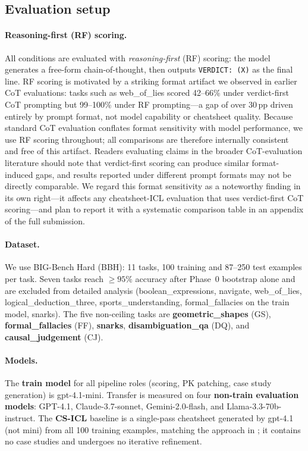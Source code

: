 \documentclass{article}
\begin{document}
\subsection{Evaluation setup}
\label{sec:eval}

\paragraph{Reasoning-first (RF) scoring.}
All conditions are evaluated with \emph{reasoning-first} (RF) scoring: the model generates a
free-form chain-of-thought, then outputs \texttt{VERDICT:~(X)} as the final line.
RF scoring is motivated by a striking format artifact we observed in earlier CoT evaluations:
tasks such as web\_of\_lies scored 42--66\% under verdict-first CoT prompting
but 99--100\% under RF prompting---a gap of over 30\,pp driven entirely by prompt format,
not model capability or cheatsheet quality.
Because standard CoT evaluation conflates format sensitivity with model performance,
we use RF scoring throughout; all comparisons are therefore internally consistent
and free of this artifact.
Readers evaluating claims in the broader CoT-evaluation literature should note that
verdict-first scoring can produce similar format-induced gaps, and results reported
under different prompt formats may not be directly comparable.
We regard this format sensitivity as a noteworthy finding in its own right---it affects any
cheatsheet-ICL evaluation that uses verdict-first CoT scoring---and plan to report it with a
systematic comparison table in an appendix of the full submission.

\paragraph{Dataset.}
We use BIG-Bench Hard (BBH): 11 tasks, 100 training and 87--250 test examples per task.
Seven tasks reach $\geq 95\%$ accuracy after Phase~0 bootstrap alone and are excluded from
detailed analysis (boolean\_expressions, navigate, web\_of\_lies, logical\_deduction\_three,
sports\_understanding, formal\_fallacies on the train model, snarks).
The five non-ceiling tasks are \textbf{geometric\_shapes} (GS),
\textbf{formal\_fallacies} (FF), \textbf{snarks}, \textbf{disambiguation\_qa} (DQ),
and \textbf{causal\_judgement} (CJ).

\paragraph{Models.}
The \textbf{train model} for all pipeline roles (scoring, PK patching, case study generation)
is gpt-4.1-mini.
Transfer is measured on four \textbf{non-train evaluation models}: GPT-4.1, Claude-3.7-sonnet,
Gemini-2.0-flash, and Llama-3.3-70b-instruct.
The \textbf{CS-ICL} baseline is a single-pass cheatsheet generated by gpt-4.1 (not mini)
from all 100 training examples, matching the approach in \citet{csicl2024}; it contains no
case studies and undergoes no iterative refinement.
\end{document}
